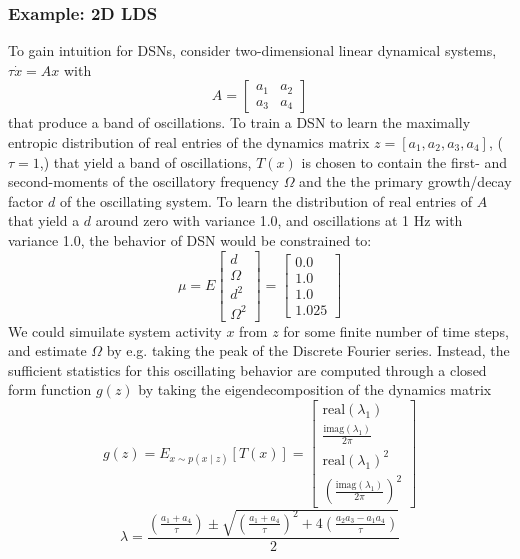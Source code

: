 \documentclass[11pt]{article}
\begin{document}
\subsubsection{Example: 2D LDS}
To gain intuition for DSNs, consider two-dimensional linear dynamical systems, $\tau \dot{x} = Ax$ with 
\[A = \begin{bmatrix} a_1 & a_2 \\ a_3 & a_4 \end{bmatrix}\]
 that produce a band of oscillations. To train a DSN to learn the maximally entropic distribution of real entries of the dynamics matrix $z = \left[a_1, a_2, a_3, a_4 \right]$, ($\tau=1$,) that yield a band of oscillations, $T(x)$ is chosen to contain the first- and second-moments of the oscillatory frequency $\Omega$ and the the primary growth/decay factor $d$ of the oscillating system.  To learn the distribution of real entries of $A$ that yield a $d$ around zero with variance 1.0, and oscillations at 1 Hz with variance 1.0, the behavior of DSN would be constrained to:
\begin{equation}
 \mu = E \begin{bmatrix} d \\ \Omega \\ d^2 \\ \Omega^2 \end{bmatrix} = \begin{bmatrix} 0.0 \\ 1.0 \\ 1.0 \\ 1.025 \end{bmatrix}
 \end{equation} 
We could simuilate system activity $x$ from $z$ for some finite number of time steps, and estimate $\Omega$ by e.g. taking the peak of the Discrete Fourier series.  Instead, the sufficient statistics for this oscillating behavior are computed through a closed form function $g(z)$ by taking the eigendecomposition of the dynamics matrix
\begin{equation}
g(z) = E_{x\sim p(x \mid z)}\left[T(x)\right] =  \begin{bmatrix} \text{real}(\lambda_1) \\ \frac{\text{imag}(\lambda_1)}{2 \pi} \\ \text{real}(\lambda_1)^2 \\ (\frac{\text{imag}(\lambda_1)}{2 \pi})^2 \end{bmatrix}
\end{equation}
\begin{equation}
\lambda = \frac{(\frac{a_1 + a_4}{\tau}) \pm \sqrt{(\frac{a_1+a_4}{\tau})^2 + 4(\frac{a_2 a_3 - a_1 a_4}{\tau})}}{2}
\end{equation}
\end{document}
